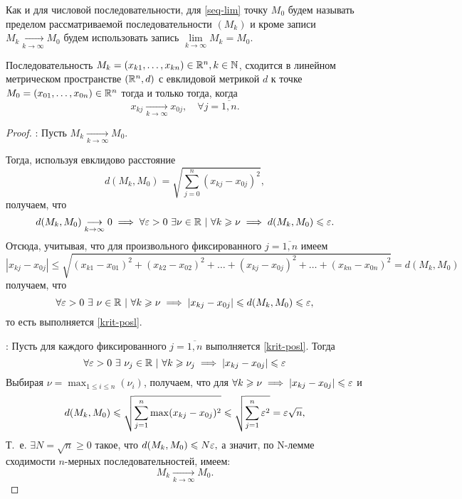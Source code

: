 \documentclass[../../main.tex]{subfiles}
\begin{document}
  Как и для числовой последовательности, для \eqref{seq-lim} точку 
  $M_0$ будем называть пределом рассматриваемой последовательности 
  $(M_k)$ и кроме записи $M_k \underset{k\rightarrow\infty}
  {\longrightarrow}  M_0$ будем использовать запись 
  $ \lim\limits_{k \to \infty}{M_k} = M_0$.
  \begin{thm}
    Последовательность $M_k = (x_{k1}, \dots, x_{kn}) \in \mathbb{R}^n, k 
    \in \mathbb{N}$, сходится в линейном метрическом пространстве $(\mathbb{R}^n, d)$
    с евклидовой метрикой $d$ к точке $M_0 = (x_{01}, \dots, x_{0n})
    \in \mathbb{R}^n$ тогда и только тогда, когда
    \begin{equation}
    \label{krit-posl}
      x_{kj}\underset{k\rightarrow\infty}
      {\longrightarrow} x_{0j}, \quad \forall j = \overline{1, n}.
    \end{equation}
  \end{thm}
  \begin{proof}
    \quad
    
    \nec: 
    Пусть $M_k \underset{k\rightarrow\infty}{\longrightarrow}  M_0$.
    
    Тогда, используя евклидово расстояние 
    \[
      d(M_k, M_0) = \sqrt{\sum_{j = 0}^{n}{(x_{kj} - x_{0j})^2}},
    \]
    получаем, что
    \[
      d(M_k, M_0) \underset{k\rightarrow\infty}{\longrightarrow} 0 
      \implies
      \forall \varepsilon > 0\ \exists \nu \in \mathbb{R}\ |\ \forall k \geqslant \nu 
      \implies d(M_k, M_0) \leqslant \varepsilon.
    \]
    Отсюда, учитывая, что для произвольного фиксированного $j = 
    \overline{1, n}$ имеем
    \[
      |x_{kj} - x_{0j}| \leq \sqrt{(x_{k1} - x_{01})^2 + (x_{k2} - 
      x_{02})^2 + \dots + (x_{kj} - x_{0j})^2 + \dots + (x_{kn} - 
      x_{0n})^2} = d(M_k, M_0) 
    \]
    получаем, что 
    \[
      \forall \varepsilon > 0\ \exists\ \nu \in \mathbb{R}\ |\ \forall k \geqslant \nu 
      \implies |x_{kj} - x_{0j}| \leqslant d(M_k, M_0) \leqslant \varepsilon,
    \]
    то есть выполняется \eqref{krit-posl}.
    
    \bigskip
    
    \suff: Пусть для каждого фиксированного $j = \overline{1, n}$ 
    выполняется \eqref{krit-posl}. Тогда
    \[
      \forall \eps > 0\ \exists\ \nu_j \in \R\ |\ \forall k \ge \nu_j 
      \implies |x_{kj} - x_{0j}| \leq \eps
    \]
    Выбирая $\displaystyle\nu = \max_{1 \le i \le n}(\nu_i)$, 
    получаем, что для $\forall k \geqslant \nu \implies |x_{kj} - x_{0j}| 
    \leqslant \varepsilon$
     и 
     \[
       d(M_k, M_0) \leqslant \sqrt{\sum_{j = 1}^{n}{\max(x_{kj} - 
       x_{0j})^2}} \leqslant \sqrt{\sum_{j = 1}^{n}{\varepsilon^2}} = 
       \varepsilon\sqrt{n}, 
     \]
     Т.~е. $\exists N = \sqrt{n} \geq 0$ такое, что $d(M_k, M_0) \leqslant 
     N \varepsilon,$ а значит, по N-лемме сходимости $n$-мерных 
     последовательностей, имеем:
     \[
       M_k \underset{k\rightarrow\infty}{\longrightarrow}  M_0.
     \]
  \end{proof}
\end{document}
